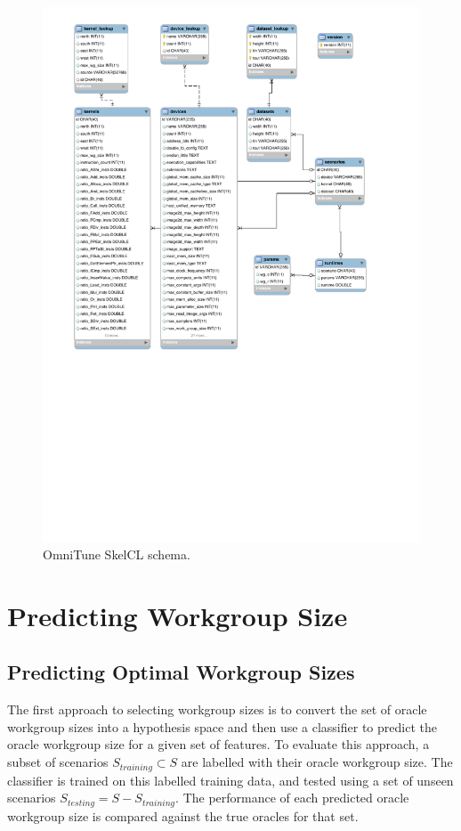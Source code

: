 \begin{figure}
\centering
\includegraphics[width=\textwidth]{img/omnitune-data-schema.pdf}
\caption{%
  OmniTune SkelCL schema.%
}
\label{fig:omnitune-system-flow}
\end{figure}


\section{Predicting Workgroup Size}




\subsection{Predicting Optimal Workgroup Sizes}

The first approach to selecting workgroup sizes is to convert the set
of oracle workgroup sizes into a hypothesis space and then use a
classifier to predict the oracle workgroup size for a given set of
features. To evaluate this approach, a subset of scenarios
$S_{training} \subset S$ are labelled with their oracle workgroup
size. The classifier is trained on this labelled training data, and
tested using a set of unseen scenarios
$S_{testing} = S - S_{training}$. The performance of each predicted
oracle workgroup size is compared against the true oracles for that
set.


